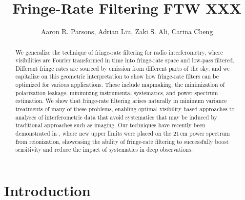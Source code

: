 \documentclass[twocolumn,apj,numberedappendix]{emulateapj}
\begin{document}
\title{Fringe-Rate Filtering FTW XXX}

\author{
Aaron R. Parsons,
Adrian Liu,
Zaki S. Ali,
Carina Cheng
}


\begin{abstract}
We generalize the technique of fringe-rate filtering for radio interferometry, where visibilities 
are Fourier transformed in time into fringe-rate space and low-pass filtered. Different fringe rates
are sourced by emission from different parts of the sky, and we capitalize on this geometric
interpretation to show how fringe-rate filters can be optimized for various applications.
These
include mapmaking, the minimization of polarization leakage, minimizing instrumental systematics,
and power spectrum estimation. We show that fringe-rate filtering arises naturally in minimum variance
treatments of many of these problems, enabling optimal visibility-based approaches to analyses of
interferometric data that avoid systematics that may be induced by traditional approaches such as imaging. Our techniques have
recently been demonstrated in \citet{ali_et_al2015}, where new upper limits
were placed on the $21\,\textrm{cm}$ power spectrum from reionization, showcasing the ability
of fringe-rate filtering to successfully boost sensitivity and reduce the impact of systematics in
deep observations.
\end{abstract}



\section{Introduction}
\end{document}
